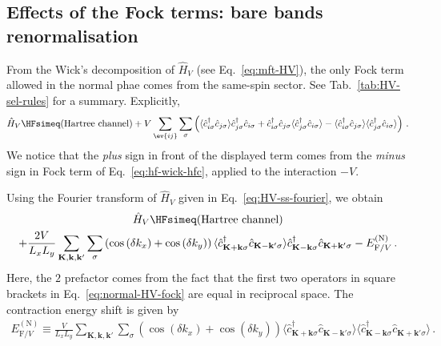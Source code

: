 \subsection{Effects of the Fock terms: bare bands renormalisation}\label{subsec:normal-fock-bands}
 
From the Wick's decomposition of $\hat H_V$ (see Eq.~\eqref{eq:mft-HV}), the only Fock term allowed in the normal phae comes from the same-spin sector. See Tab.~\ref{tab:HV-sel-rules} for a summary. Explicitly,
\begin{equation}\label{eq:normal-HV-fock}
	\hat H_V \HFsimeq (\text{Hartree channel}) + 
	V \sum_{\ev{ij}} \sum_\sigma \left(
		\langle
		\hat c_{i\sigma}^\dagger \hat c_{j\sigma}
		\rangle \hat c_{j\sigma}^\dagger  \hat c_{i\sigma} + 
		\hat c_{i\sigma}^\dagger \hat c_{j\sigma}
		\langle \hat c_{j\sigma}^\dagger  \hat c_{i\sigma} \rangle - \langle \hat c_{i\sigma}^\dagger \hat c_{j\sigma}
		\rangle \langle \hat c_{j\sigma}^\dagger  \hat c_{i\sigma} \rangle
	\right) \, .
\end{equation}
We notice that the \textit{plus} sign in front of the displayed term comes from the \textit{minus} sign in Fock term of Eq.~\eqref{eq:hf-wick-hfc}, applied to the interaction $-V$.

Using the Fourier transform of $\hat H_V$ given in Eq.~\eqref{eq:HV-ss-fourier}, we obtain
\begin{multline}
	\hat H_V \HFsimeq (\text{Hartree channel}) \\
	+ \frac{2V}{L_x L_y} \sum_{\mathbf{K}, \mathbf{k}, \mathbf{k}'} \sum_\sigma \left(
	\cos \left(
	\delta k_x
	\right)	+ \cos \left(
	\delta k_y
	\right)	
	\right)
	\langle
	\hat c_{\mathbf{K}+\mathbf{k} \sigma}^\dagger 
	\hat c_{\mathbf{K}-\mathbf{k}' \sigma}
	\rangle
	\hat c_{\mathbf{K}-\mathbf{k} \sigma}^\dagger  \hat c_{\mathbf{K}+\mathbf{k}'\sigma} - E_{\mathrm{F}/V}^{(\mathrm{N})} \, . \label{eq:normal-V-fock-int1}
\end{multline}
Here, the $2$ prefactor comes from the fact that the first two operators in square brackets in Eq.~\eqref{eq:normal-HV-fock} are equal in reciprocal space. The contraction energy shift is given by
\begin{align}\label{eq:normal-V-fock-double-counting}
	E_{\mathrm{F}/V}^{(\mathrm{N})} \equiv \frac{V}{L_x L_y} \sum_{\mathbf{K}, \mathbf{k}, \mathbf{k}'} \sum_\sigma \left(
		\cos \left(
			\delta k_x
		\right)	+ \cos \left(
			\delta k_y
		\right)	
	\right)
	\langle
		\hat c_{\mathbf{K}+\mathbf{k} \sigma}^\dagger 
	\hat c_{\mathbf{K}-\mathbf{k}' \sigma}
	\rangle \langle
		\hat c_{\mathbf{K}-\mathbf{k} \sigma}^\dagger  \hat c_{\mathbf{K}+\mathbf{k}'\sigma} 
	\rangle \, .
\end{align}

